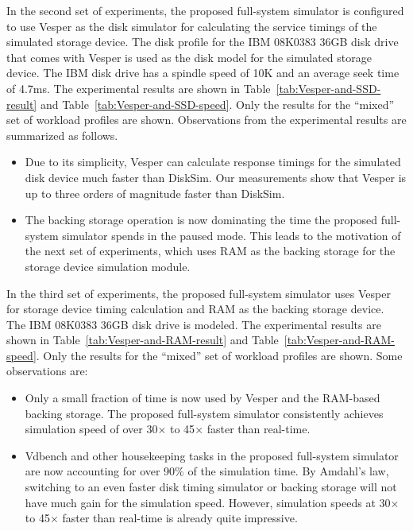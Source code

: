 In the second set of experiments, the proposed full-system simulator is configured to use Vesper as the disk simulator for calculating the service timings of the simulated storage device. The disk profile for the IBM 08K0383 36GB disk drive that comes with Vesper is used as the disk model for the simulated storage device. The IBM disk drive has a spindle speed of 10K and an average seek time of 4.7ms. The experimental results are shown in Table~\ref{tab:Vesper-and-SSD-result} and Table~\ref{tab:Vesper-and-SSD-speed}. Only the results for the ``mixed'' set of workload profiles are shown. Observations from the experimental results are summarized as follows.

\begin{itemize}
	\item Due to its simplicity, Vesper can calculate response timings for the simulated disk device much faster than DiskSim. Our measurements show that Vesper is up to three orders of magnitude faster than DiskSim.
	
	\item The backing storage operation is now dominating the time the proposed full-system simulator spends in the paused mode. This leads to the motivation of the next set of experiments, which uses RAM as the backing storage for the storage device simulation module.
\end{itemize}

In the third set of experiments, the proposed full-system simulator uses Vesper for storage device timing calculation and RAM as the backing storage device. The IBM 08K0383 36GB disk drive is modeled. The experimental results are shown in Table~\ref{tab:Vesper-and-RAM-result} and Table~\ref{tab:Vesper-and-RAM-speed}. Only the results for the ``mixed'' set of workload profiles are shown. Some observations are:

\begin{itemize}
	\item Only a small fraction of time is now used by Vesper and the RAM-based backing storage. The proposed full-system simulator consistently achieves simulation speed of over 30$\times$ to 45$\times$ faster than real-time.
	
	\item Vdbench and other housekeeping tasks in the proposed full-system simulator are now accounting for over 90\% of the simulation time. By Amdahl's law, switching to an even faster disk timing simulator or backing storage will not have much gain for the simulation speed. However, simulation speeds at 30$\times$ to 45$\times$ faster than real-time is already quite impressive.
\end{itemize}

